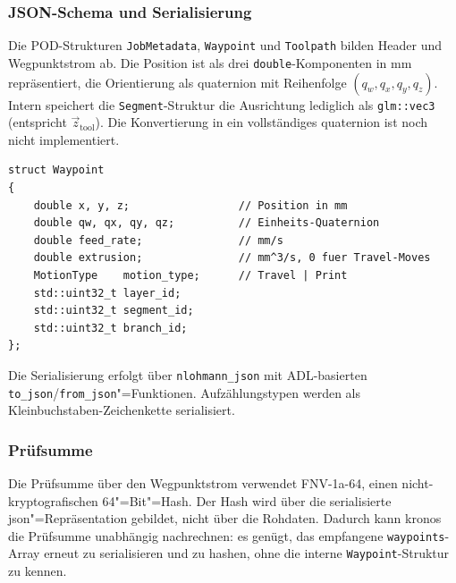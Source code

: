             \subsubsection{JSON-Schema und Serialisierung}\label{subsubsec:impl-medusa-json-schema} 
                Die POD-Strukturen \texttt{JobMetadata}, \texttt{Waypoint} und \texttt{Toolpath} bilden Header und Wegpunktstrom ab.
                Die Position ist als drei \texttt{double}-Komponenten in \si{mm} repräsentiert, die Orientierung als \gls{quaternion} mit Reihenfolge $(q_w, q_x, q_y, q_z)$.
                Intern speichert die \texttt{Segment}-Struktur die Ausrichtung lediglich als \texttt{glm::vec3} (entspricht $\vec{z}_\mathrm{tool}$).
                Die Konvertierung in ein vollständiges \gls{quaternion} ist noch nicht implementiert.


                \begin{lstlisting}[style=cppStyle, caption={POD-Struktur \texttt{Waypoint}.}, label={lst:impl-medusa-waypoint}]
struct Waypoint
{
    double x, y, z;                 // Position in mm
    double qw, qx, qy, qz;          // Einheits-Quaternion
    double feed_rate;               // mm/s
    double extrusion;               // mm^3/s, 0 fuer Travel-Moves
    MotionType    motion_type;      // Travel | Print
    std::uint32_t layer_id;
    std::uint32_t segment_id;
    std::uint32_t branch_id;
};
                \end{lstlisting}

                Die Serialisierung erfolgt über \texttt{nlohmann\_json} mit \ac{ADL}-basierten \texttt{to\_json}\slash\allowbreak\texttt{from\_json}"=Funktionen.
                Aufzählungstypen werden als Kleinbuchstaben-Zeichenkette serialisiert.

            \subsubsection{Prüfsumme}\label{subsubsec:impl-medusa-checksum}
                Die Prüfsumme über den Wegpunktstrom verwendet \gls{FNV-1a}-64, einen nicht-kryptografischen 64"=Bit"=Hash.
                Der Hash wird über die serialisierte \gls{json}"=Repräsentation gebildet, nicht über die Rohdaten.
                Dadurch kann \ac{kronos} die Prüfsumme unabhängig nachrechnen: es genügt, das empfangene \texttt{waypoints}-Array erneut zu serialisieren und zu hashen, ohne die interne \texttt{Waypoint}-Struktur zu kennen.

